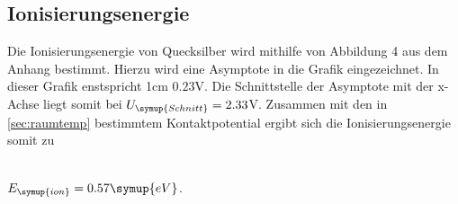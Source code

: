     


    \subsection{Ionisierungsenergie} 
    Die Ionisierungsenergie von Quecksilber wird mithilfe von Abbildung 4 aus dem Anhang bestimmt. 
    Hierzu wird eine Asymptote in die Grafik eingezeichnet. In dieser Grafik enstspricht 1cm $0.23$V.
    Die Schnittstelle der Asymptote mit der x-Achse liegt somit bei $U_{\symup{Schnitt}} = 2.33$V.
    Zusammen mit den in \autoref{sec:raumtemp} bestimmtem Kontaktpotential
    ergibt sich die Ionisierungsenergie somit zu
    \\ \\
    \centerline{$E_{\symup{ion}} = 0.57 \symup{eV}$.}
    \\ \\
